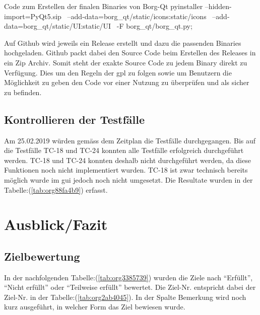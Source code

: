 \begin{sexylisting}[label=orga8745e6]{Code zum Erstellen der finalen Binaries von Borg-Qt}
pyinstaller --hidden-import=PyQt5.sip \
    --add-data=borg_qt/static/icons:static/icons \
    --add-data=borg_qt/static/UI:static/UI \
    -F borg_qt/borg_qt.py; \
\end{sexylisting}
\newpage
Auf Github wird jeweils ein Release erstellt und dazu die passenden Binaries
hochgeladen. Github packt dabei den Source Code beim Erstellen des Releases in
ein Zip Archiv. Somit steht der exakte Source Code zu jedem Binary direkt zu
Verfügung. Dies um den Regeln der \gls{gpl} zu folgen sowie um Benutzern die
Möglichkeit zu geben den Code vor einer Nutzung zu überprüfen und als sicher zu
befinden.

\subsection{Kontrollieren der Testfälle}
\label{sec:orgc9c6334}

Am 25.02.2019 würden gemäss dem Zeitplan die Testfälle durchgegangen. Bis auf
die Testfälle TC-18 und TC-24 konnten alle Testfälle erfolgreich durchgeführt
werden. TC-18 und TC-24 konnten deshalb nicht durchgeführt werden, da diese
Funktionen noch nicht implementiert wurden. TC-18 ist zwar technisch bereits
möglich wurde im \gls{gui} jedoch noch nicht umgesetzt. Die Resultate wurden in
der Tabelle:(\ref{tab:org88fa4b9}) erfasst.

\cleardoublepage
\section{Ausblick/Fazit}
\label{sec:org859a9c9}
\subsection{Zielbewertung}
\label{sec:orge97ea77}

In der nachfolgenden Tabelle:(\ref{tab:org3385739}) wurden die Ziele nach
"`Erfüllt"', "`Nicht erfüllt"' oder "`Teilweise erfüllt"' bewertet. Die Ziel-Nr.
entspricht dabei der Ziel-Nr. in der Tabelle:(\ref{tab:org2ab4045}). In der Spalte
Bemerkung wird noch kurz ausgeführt, in welcher Form das Ziel bewiesen wurde.

